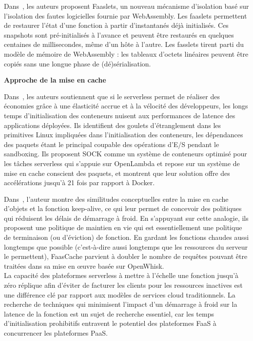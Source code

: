 Dans~\cite{shillakerFaasmLightweightIsolation2020}, les auteurs proposent Faaslets, un nouveau mécanisme d'isolation basé sur l'isolation des fautes logicielles fournie par WebAssembly. Les faaslets permettent de restaurer l'état d'une fonction à partir d'instantanés déjà initialisés. Ces snapshots sont pré-initialisés à l'avance et peuvent être restaurés en quelques centaines de millisecondes, même d'un hôte à l'autre. Les fasslets tirent parti du modèle de mémoire de WebAssembly : les tableaux d'octets linéaires peuvent être copiés sans une longue phase de (dé)sérialisation.

\textbf{Approche de la mise en cache}

Dans~\cite{oakesSOCKRapidTask}, les auteurs soutiennent que si le serverless permet de réaliser des économies grâce à une élasticité accrue et à la vélocité des développeurs, les longs temps d'initialisation des conteneurs nuisent aux performances de latence des applications déployées. Ils identifient des goulets d'étranglement dans les primitives Linux impliquées dans l'initialisation des conteneurs, les dépendances des paquets étant le principal coupable des opérations d'E/S pendant le sandboxing. Ils proposent SOCK comme un système de conteneurs optimisé pour les tâches serverless qui s'appuie sur OpenLambda et repose sur un système de mise en cache conscient des paquets, et montrent que leur solution offre des accélérations jusqu'à 21 fois par rapport à Docker.

Dans~\cite{fuerstFaasCacheKeepingServerless2021}, l'auteur montre des similitudes conceptuelles entre la mise en cache d'objets et la fonction keep-alive, ce qui leur permet de concevoir des politiques qui réduisent les délais de démarrage à froid. En s'appuyant sur cette analogie, ils proposent une politique de maintien en vie qui est essentiellement une politique de terminaison (ou d'éviction) de fonction. En gardant les fonctions chaudes aussi longtemps que possible (c'est-à-dire aussi longtemps que les ressources du serveur le permettent), FaasCache parvient à doubler le nombre de requêtes pouvant être traitées dans sa mise en œuvre basée sur OpenWhisk.
\\

La capacité des plateformes serverless à mettre à l'échelle une fonction jusqu'à zéro réplique afin d'éviter de facturer les clients pour les ressources inactives est une différence clé par rapport aux modèles de services cloud traditionnels. La recherche de techniques qui minimisent l'impact d'un démarrage à froid sur la latence de la fonction est un sujet de recherche essentiel, car les temps d'initialisation prohibitifs entravent le potentiel des plateformes FaaS à concurrencer les plateformes PaaS.


